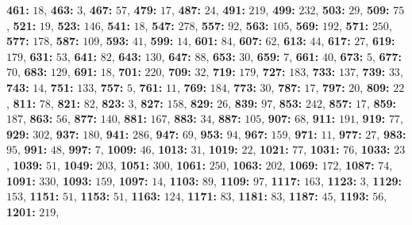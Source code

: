 \textsf{\bfseries 461:} $18$, \textsf{\bfseries 463:} $3$, \textsf{\bfseries 467:} $57$, \textsf{\bfseries 479:} $17$, \textsf{\bfseries 487:} $24$, \textsf{\bfseries 491:} $219$, \textsf{\bfseries 499:} $232$, \textsf{\bfseries 503:} $29$, \textsf{\bfseries 509:} $75$, \textsf{\bfseries 521:} $19$, \textsf{\bfseries 523:} $146$, \textsf{\bfseries 541:} $18$, \textsf{\bfseries 547:} $278$, 
\textsf{\bfseries 557:} $92$, \textsf{\bfseries 563:} $105$, \textsf{\bfseries 569:} $192$, \textsf{\bfseries 571:} $250$, \textsf{\bfseries 577:} $178$, \textsf{\bfseries 587:} $109$, \textsf{\bfseries 593:} $41$, \textsf{\bfseries 599:} $14$, \textsf{\bfseries 601:} $84$, \textsf{\bfseries 607:} $62$, \textsf{\bfseries 613:} $44$, \textsf{\bfseries 617:} $27$, \textsf{\bfseries 619:} $179$, \textsf{\bfseries 631:} $53$, \textsf{\bfseries 641:} $82$, \textsf{\bfseries 643:} $130$, \textsf{\bfseries 647:} $88$, \textsf{\bfseries 653:} $30$, \textsf{\bfseries 659:} $7$, \textsf{\bfseries 661:} $40$, \textsf{\bfseries 673:} $5$, \textsf{\bfseries 677:} $70$, \textsf{\bfseries 683:} $129$, \textsf{\bfseries 691:} $18$, \textsf{\bfseries 701:} $220$, \textsf{\bfseries 709:} $32$, \textsf{\bfseries 719:} $179$, \textsf{\bfseries 727:} $183$, \textsf{\bfseries 733:} $137$, \textsf{\bfseries 739:} $33$, \textsf{\bfseries 743:} $14$, \textsf{\bfseries 751:} $133$, \textsf{\bfseries 757:} $5$, \textsf{\bfseries 761:} $11$, \textsf{\bfseries 769:} $184$, \textsf{\bfseries 773:} $30$, \textsf{\bfseries 787:} $17$, \textsf{\bfseries 797:} $20$, \textsf{\bfseries 809:} $22$, \textsf{\bfseries 811:} $78$, \textsf{\bfseries 821:} $82$, \textsf{\bfseries 823:} $3$, \textsf{\bfseries 827:} $158$, \textsf{\bfseries 829:} $26$, \textsf{\bfseries 839:} $97$, \textsf{\bfseries 853:} $242$, \textsf{\bfseries 857:} $17$, \textsf{\bfseries 859:} $187$, \textsf{\bfseries 863:} $56$, \textsf{\bfseries 877:} $140$, \textsf{\bfseries 881:} $167$, \textsf{\bfseries 883:} $34$, \textsf{\bfseries 887:} $105$, \textsf{\bfseries 907:} $68$, \textsf{\bfseries 911:} $191$, \textsf{\bfseries 919:} $77$, \textsf{\bfseries 929:} $302$, \textsf{\bfseries 937:} $180$, \textsf{\bfseries 941:} $286$, \textsf{\bfseries 947:} $69$, \textsf{\bfseries 953:} $94$, \textsf{\bfseries 967:} $159$, \textsf{\bfseries 971:} $11$, \textsf{\bfseries 977:} $27$, \textsf{\bfseries 983:} $95$, \textsf{\bfseries 991:} $48$, \textsf{\bfseries 997:} $7$, \textsf{\bfseries 1009:} $46$, \textsf{\bfseries 1013:} $31$, \textsf{\bfseries 1019:} $22$, \textsf{\bfseries 1021:} $77$, \textsf{\bfseries 1031:} $76$, \textsf{\bfseries 1033:} $23$, \textsf{\bfseries 1039:} $51$, \textsf{\bfseries 1049:} $203$, \textsf{\bfseries 1051:} $300$, \textsf{\bfseries 1061:} $250$, \textsf{\bfseries 1063:} $202$, \textsf{\bfseries 1069:} $172$, \textsf{\bfseries 1087:} $74$, \textsf{\bfseries 1091:} $330$, \textsf{\bfseries 1093:} $159$, \textsf{\bfseries 1097:} $14$, \textsf{\bfseries 1103:} $89$, \textsf{\bfseries 1109:} $97$, \textsf{\bfseries 1117:} $163$, \textsf{\bfseries 1123:} $3$, \textsf{\bfseries 1129:} $153$, \textsf{\bfseries 1151:} $51$, \textsf{\bfseries 1153:} $51$, \textsf{\bfseries 1163:} $124$, \textsf{\bfseries 1171:} $83$, \textsf{\bfseries 1181:} $83$, \textsf{\bfseries 1187:} $45$, \textsf{\bfseries 1193:} $56$, \textsf{\bfseries 1201:} $219$, 